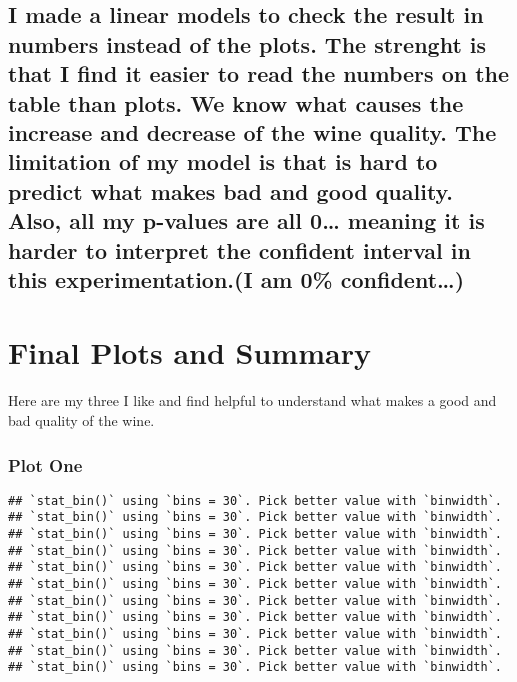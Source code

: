 \documentclass[]{article}
\begin{document}
\subsection{I made a linear models to check the result in numbers
instead of the plots. The strenght is that I find it easier to read the
numbers on the table than plots. We know what causes the increase and
decrease of the wine quality. The limitation of my model is that is hard
to predict what makes bad and good quality. Also, all my p-values are
all 0\ldots{} meaning it is harder to interpret the confident interval
in this experimentation.(I am 0\%
confident\ldots{})}\label{i-made-a-linear-models-to-check-the-result-in-numbers-instead-of-the-plots.-the-strenght-is-that-i-find-it-easier-to-read-the-numbers-on-the-table-than-plots.-we-know-what-causes-the-increase-and-decrease-of-the-wine-quality.-the-limitation-of-my-model-is-that-is-hard-to-predict-what-makes-bad-and-good-quality.-also-all-my-p-values-are-all-0-meaning-it-is-harder-to-interpret-the-confident-interval-in-this-experimentation.i-am-0-confident}

\section{Final Plots and Summary}\label{final-plots-and-summary}

Here are my three I like and find helpful to understand what makes a
good and bad quality of the wine.

\subsubsection{Plot One}\label{plot-one}

\begin{verbatim}
## `stat_bin()` using `bins = 30`. Pick better value with `binwidth`.
## `stat_bin()` using `bins = 30`. Pick better value with `binwidth`.
## `stat_bin()` using `bins = 30`. Pick better value with `binwidth`.
## `stat_bin()` using `bins = 30`. Pick better value with `binwidth`.
## `stat_bin()` using `bins = 30`. Pick better value with `binwidth`.
## `stat_bin()` using `bins = 30`. Pick better value with `binwidth`.
## `stat_bin()` using `bins = 30`. Pick better value with `binwidth`.
## `stat_bin()` using `bins = 30`. Pick better value with `binwidth`.
## `stat_bin()` using `bins = 30`. Pick better value with `binwidth`.
## `stat_bin()` using `bins = 30`. Pick better value with `binwidth`.
## `stat_bin()` using `bins = 30`. Pick better value with `binwidth`.
\end{verbatim}
\end{document}
